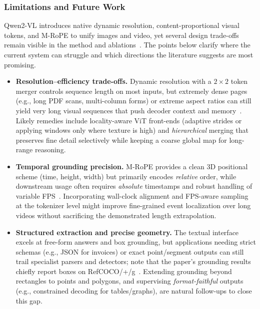\begin{enrichment}
\begin{enrichment}
        \subsubsection{Limitations and Future Work}
        \label{subsubsec:chapter24_qwen2vl_limits}
        
        Qwen2\mbox{-}VL introduces native dynamic resolution, content\mbox{-}proportional visual tokens, and M\mbox{-}RoPE to unify images and video, yet several design trade\mbox{-}offs remain visible in the method and ablations~\cite{wang2024_qwen2vl}. The points below clarify where the current system can struggle and which directions the literature suggests are most promising.
        
        \begin{itemize}
            \item \textbf{Resolution--efficiency trade-offs.} Dynamic resolution with a $2{\times}2$ token merger controls sequence length on most inputs, but extremely dense pages (e.g., long PDF scans, multi\mbox{-}column forms) or extreme aspect ratios can still yield very long visual sequences that push decoder context and memory~\cite[Table~2; Table~7]{wang2024_qwen2vl}. Likely remedies include locality\mbox{-}aware ViT front\mbox{-}ends (adaptive strides or applying windows only where texture is high) and \emph{hierarchical} merging that preserves fine detail selectively while keeping a coarse global map for long\mbox{-}range reasoning.
            
            \item \textbf{Temporal grounding precision.} M\mbox{-}RoPE provides a clean 3D positional scheme (time, height, width) but primarily encodes \emph{relative} order, while downstream usage often requires \emph{absolute} timestamps and robust handling of variable FPS~\cite[Table~4; Table~2; Fig.\,``Accuracy vs.\ Inference Sequence Length'']{wang2024_qwen2vl}. Incorporating wall\mbox{-}clock alignment and FPS\mbox{-}aware sampling at the tokenizer level might improve fine\mbox{-}grained event localization over long videos without sacrificing the demonstrated length extrapolation.
            
            \item \textbf{Structured extraction and precise geometry.} The textual interface excels at free\mbox{-}form answers and box grounding, but applications needing strict schemas (e.g., JSON for invoices) or exact point/segment outputs can still trail specialist parsers and detectors; note that the paper’s grounding results chiefly report boxes on RefCOCO/+/g~\cite[Table~6]{wang2024_qwen2vl}. Extending grounding beyond rectangles to points and polygons, and supervising \emph{format\mbox{-}faithful} outputs (e.g., constrained decoding for tables/graphs), are natural follow\mbox{-}ups to close this gap.
            

\end{itemize}
\end{enrichment}
\end{enrichment}
